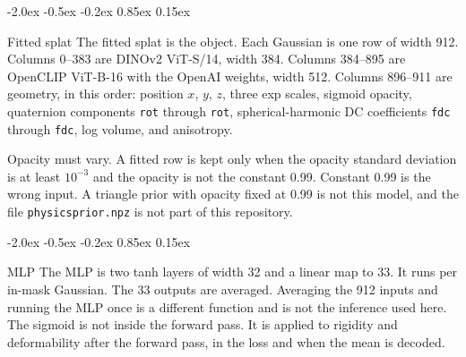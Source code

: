 \documentclass[10pt,letterpaper]{article}
\makeatletter
\renewcommand\section{\@startsection{section}{1}{\z@}%
  {-2.0ex \@plus -0.5ex \@minus -0.2ex}%
  {0.85ex \@plus 0.15ex}%
  {\large\bfseries\raggedright}}
\DeclareRobustCommand{\_}{\textunderscore\allowbreak}
\makeatother
\begin{document}
\begin{lrbox}{\titlebox}
\begin{minipage}{\textwidth}
\begin{center}

\end{center}
\end{minipage}
\end{lrbox}

\twocolumn[\usebox\titlebox]
\thispagestyle{plain}

\section{Fitted splat}
The fitted splat is the object.
Each Gaussian is one row of width 912.
Columns 0--383 are DINOv2 ViT-S/14, width 384.
Columns 384--895 are OpenCLIP ViT-B-16 with the \mbox{OpenAI} weights, width 512.
Columns 896--911 are geometry, in this order: position \(x\), \(y\), \(z\), three exp scales, sigmoid opacity, quaternion components \texttt{rot\_0} through \texttt{rot\_3}, spherical-harmonic DC coefficients \texttt{f\_dc\_0} through \texttt{f\_dc\_2}, log volume, and anisotropy.

Opacity must vary.
A fitted row is kept only when the opacity standard deviation is at least \(10^{-3}\) and the opacity is not the constant 0.99.
Constant 0.99 is the wrong input.
A triangle prior with opacity fixed at 0.99 is not this model, and the file \texttt{physics\_prior.npz} is not part of this repository.

\section{MLP}
The MLP is two tanh layers of width 32 and a linear map to 33.
It runs per in-mask Gaussian.
The 33 outputs are averaged.
Averaging the 912 inputs and running the MLP once is a different function and is not the inference used here.
The sigmoid is not inside the forward pass.
It is applied to rigidity and deformability after the forward pass, in the loss and when the mean is decoded.
\end{document}
